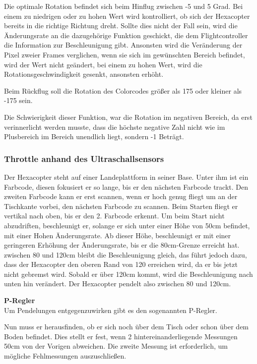     Die optimale Rotation befindet sich beim Hinflug zwischen -5 und 5 Grad. 
    Bei einem zu niedrigen oder zu hohen Wert wird kontrolliert, ob sich der Hexacopter bereits in die richtige Richtung dreht. 
    Sollte dies nicht der Fall sein, wird die Änderungsrate an die dazugehörige Funktion geschickt, die dem Flightcontroller die Information zur Beschleunigung gibt. 
    Ansonsten wird die Veränderung der Pixel zweier Frames verglichen, wenn sie sich im gewünschten Bereich befindet, wird der Wert nicht geändert, bei einem zu hohen Wert, wird die Rotationsgeschwindigkeit gesenkt, ansonsten erhöht.

    Beim Rückflug soll die Rotation des Colorcodes größer als 175 oder kleiner als -175 sein. 

    Die Schwierigkeit dieser Funktion, war die Rotation im negativen Bereich, da erst verinnerlicht werden musste, dass die höchste negative Zahl nicht wie im Plusbereich im Bereich unendlich liegt, sondern -1 Beträgt.


    \subsubsection{Throttle anhand des Ultraschallsensors}
    Der Hexacopter steht auf einer Landeplattform in seiner Base. Unter ihm ist ein Farbcode, diesen fokusiert er so lange, bis er den nächsten Farbcode trackt. Den zweiten Farbcode kann er erst scannen, wenn er hoch genug fliegt um an der Tischkante vorbei, den nächsten Farbcode zu scannen.
    Beim Starten fliegt er vertikal nach oben, bis er den 2. Farbcode erkennt. Um beim Start nicht abzudriften, beschleunigt er, solange er sich unter einer Höhe von 50cm befindet, mit einer Hohen Änderungsrate. Ab dieser Höhe, beschleunigt er mit einer geringeren Erhöhung der Änderungsrate, bis er die 80cm-Grenze erreicht hat. 
    zwischen 80 und 120cm bleibt die Beschleunigung gleich, das führt jedoch dazu, dass der Hexacopter den oberen Rand von 120 erreichen wird, da er bis jetzt nicht gebremst wird. Sobald er über 120cm kommt, wird die Beschleunigung nach unten hin verändert. Der Hexacopter pendelt also zwischen 80 und 120cm.

    \textbf{P-Regler}\\
    Um Pendelungen entgegenzuwirken gibt es den sogenannten P-Regler.

    Nun muss er herausfinden, ob er sich noch über dem Tisch oder schon über dem Boden befindet. Dies stellt er fest, wenn 2 hintereinanderliegende Messungen 50cm von der Vorigen abweichen. Die zweite Messung ist erforderlich, um mögliche Fehlmessungen auszuschließen.

